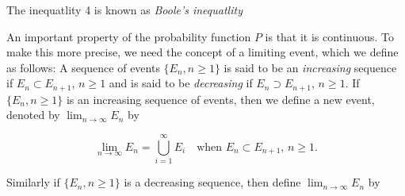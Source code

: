 \documentclass[lang=cn,10pt,thmcnt=section]{elegantbook}
\begin{document}
The inequatlity 4 is known as \textit{Boole's inequatlity}

An important property of the probability function \( P \) is that it is continuous.
To make this more precise, we need the concept of a limiting event, which we define as follows:
A sequence of events \( \{E_n, n \geq 1\} \) is said to be an \textit{increasing} sequence if \( E_n \subset E_{n+1} \), \( n \geq 1 \) and is said to be \textit{decreasing} if \( E_n \supset E_{n+1} \), \( n \geq 1 \).
If \( \{E_n, n \geq 1\} \) is an increasing sequence of events, then we define a new event, denoted by \( \lim_{n \to \infty} E_n \) by

\[
\lim_{n \to \infty} E_n = \bigcup_{i=1}^{\infty} E_i \quad \text{when } E_n \subset E_{n+1}, \, n \geq 1.
\]

Similarly if \( \{E_n, n \geq 1\} \) is a decreasing sequence, then define \( \lim_{n \to \infty} E_n \) by
\end{document}
